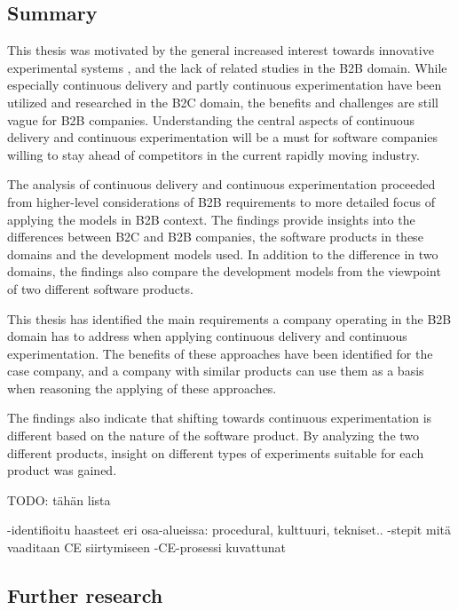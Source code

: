 \documentclass[english]{tktltiki2}
\theoremstyle{definition}
\theoremstyle{remark}
\begin{document}
\begin{enumerate}
\subsection{Summary}
This thesis was motivated by the general increased interest towards innovative experimental systems \cite{olsson2012climbing}, and the lack of related studies in the B2B domain. While especially continuous delivery and partly continuous experimentation have been utilized and researched in the B2C domain, the benefits and challenges are still vague for B2B companies. Understanding the central aspects of continuous delivery and continuous experimentation will be a must for software companies willing to stay ahead of competitors in the current rapidly moving industry.

The analysis of continuous delivery and continuous experimentation proceeded from higher-level considerations of B2B requirements to more detailed focus of applying the models in B2B context. The findings provide insights into the differences between B2C and B2B companies, the software products in these domains and the development models used. In addition to the difference in two domains, the findings also compare the development models from the viewpoint of two different software products.

This thesis has identified the main requirements a company operating in the B2B domain has to address when applying continuous delivery and continuous experimentation. The benefits of these approaches have been identified for the case company, and a company with similar products can use them as a basis when reasoning the applying of these approaches. 

The findings also indicate that shifting towards continuous experimentation is different based on the nature of the software product. By analyzing the two different products, insight on different types of experiments suitable for each product was gained.    




TODO: tähän lista

-identifioitu haasteet eri osa-alueissa: procedural, kulttuuri, tekniset..
-stepit mitä vaaditaan CE siirtymiseen
-CE-prosessi kuvattunat



\subsection{Further research}


\end{enumerate}
\end{document}
